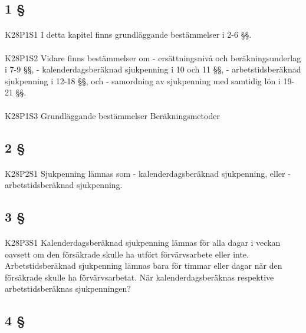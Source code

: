 \documentclass[a4paper,notitlepage,openany,10pt]{book}
\begin{document}
\subsection*{1 §}
\paragraph*{}
{\tiny K28P1S1}
I detta kapitel finns grundläggande bestämmelser i 2-6 §§.
\paragraph*{}
{\tiny K28P1S2}
Vidare finns bestämmelser om
\newline - ersättningsnivå och beräkningsunderlag i 7-9 §§,
\newline - kalenderdagsberäknad sjukpenning i 10 och 11 §§,
\newline - arbetstidsberäknad sjukpenning i 12-18 §§, och
\newline - samordning av sjukpenning med samtidig lön i 19-21 §§.
\paragraph*{}
{\tiny K28P1S3}
Grundläggande bestämmelser Beräkningsmetoder
\subsection*{2 §}
\paragraph*{}
{\tiny K28P2S1}
Sjukpenning lämnas som
\newline - kalenderdagsberäknad sjukpenning, eller
\newline - arbetstidsberäknad sjukpenning.
\subsection*{3 §}
\paragraph*{}
{\tiny K28P3S1}
Kalenderdagsberäknad sjukpenning lämnas för alla dagar i veckan oavsett om den försäkrade skulle ha utfört förvärvsarbete eller inte.
Arbetstidsberäknad sjukpenning lämnas bara för timmar eller dagar när den försäkrade skulle ha förvärvsarbetat.
När kalenderdagsberäknas respektive arbetstidsberäknas sjukpenningen?
\subsection*{4 §}
\end{document}
